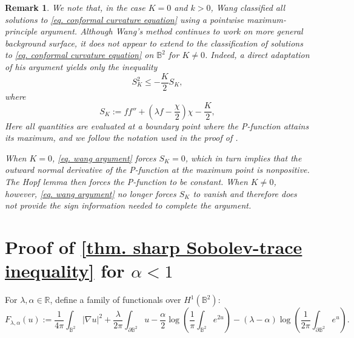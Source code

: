 \documentclass[11pt,a4paper,twoside]{amsart}
\newtheorem{remark}[theorem]{Remark}
\newtheorem{sketch proof}{Sketch of the proof}[section]
\begin{document}
\begin{remark}\label{RK comp with wang}
    We note that, in the case $K=0$ and $k>0$, Wang \cite{Wang2017} classified all solutions to \cref{eq. conformal curvature equation} using a pointwise maximum-principle argument. Although Wang's method continues to work on more general background surface, it does not appear to extend to the classification of solutions to \cref{eq. conformal curvature equation} on $\mathbb{B}^2$ for $K\not=0$. Indeed, a direct adaptation of his argument yields only the inequality
\begin{equation}
\label{eq. wang argument}
S_K^2\leq -\frac{K}{2}S_K,
\end{equation}
 where 
    \[
    S_K:=ff''+
    \left(\lambda f-\frac{\chi}{2}\right)\chi
    -\frac{K}{2},
    \]
Here all quantities are evaluated at a boundary point where the P-function attains its maximum, and we follow the notation used in the proof of \cite[Theorem 6]{Wang2017}.

When $K=0$, \cref{eq. wang argument} forces $S_K=0$, which in turn implies that the outward normal derivative of the P-function at the maximum point is nonpositive. The Hopf lemma then forces the P-function to be constant.
When $K\not=0$, however, \cref{eq. wang argument} no longer forces $S_K$ to vanish and therefore does not provide the sign information needed to complete the argument.
\end{remark}
 
\section{Proof of \cref{thm. sharp Sobolev-trace inequality} for $\alpha<1$}\label{App results}

For $\lambda,\alpha\in\mathbb{R}$, define a family of functionals over $H^1(\mathbb{B}^2)$:
    \begin{equation}\label{eq. def of functional F}
        F_{\lambda,\alpha}(u)
        :=\frac{1}{4\pi}
        \int_{\mathbb{B}^2}|\nabla u|^2
        +\frac{\lambda}{2\pi}
        \int_{\partial \mathbb{B}^2}u
        -\frac{\alpha}{2}
        \log\left(
        \frac{1}{\pi}\int_{\mathbb{B}^2}e^{2u}
        \right)
        -(\lambda-\alpha)
        \log\left(
        \frac{1}{2\pi}
        \int_{\partial\mathbb{B}^2}e^{u}
        \right).
    \end{equation}
    
\end{document}
